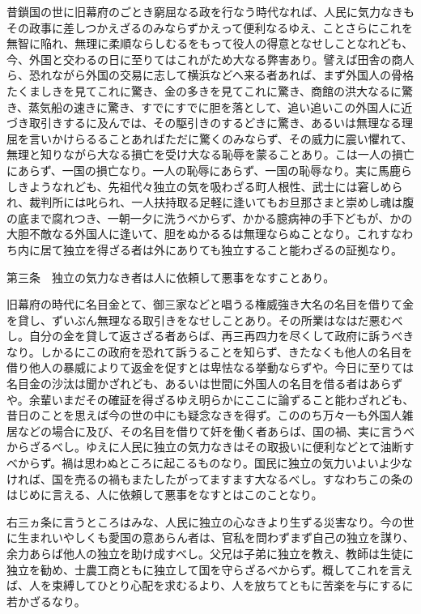 \documentclass[a4paper, platex, dvipdfmx]{jsarticle}
\begin{document}
昔鎖国の世に旧幕府のごとき窮屈なる政を行なう時代なれば、人民に気力なきもその政事に差しつかえざるのみならずかえって便利なるゆえ、ことさらにこれを無智に陥れ、無理に柔順ならしむるをもって役人の得意となせしことなれども、今、外国と交わるの日に至りてはこれがため大なる弊害あり。譬えば田舎の商人ら、恐れながら外国の交易に志して横浜などへ来る者あれば、まず外国人の骨格たくましきを見てこれに驚き、金の多きを見てこれに驚き、商館の洪大なるに驚き、蒸気船の速きに驚き、すでにすでに胆を落として、追い追いこの外国人に近づき取引きするに及んでは、その駆引きのするどきに驚き、あるいは無理なる理屈を言いかけらるることあればただに驚くのみならず、その威力に震い懼れて、無理と知りながら大なる損亡を受け大なる恥辱を蒙ることあり。こは一人の損亡にあらず、一国の損亡なり。一人の恥辱にあらず、一国の恥辱なり。実に馬鹿らしきようなれども、先祖代々独立の気を吸わざる町人根性、武士には窘しめられ、裁判所には叱られ、一人扶持取る足軽に逢いてもお旦那さまと崇めし魂は腹の底まで腐れつき、一朝一夕に洗うべからず、かかる臆病神の手下どもが、かの大胆不敵なる外国人に逢いて、胆をぬかるるは無理ならぬことなり。これすなわち内に居て独立を得ざる者は外にありても独立すること能わざるの証拠なり。

第三条　独立の気力なき者は人に依頼して悪事をなすことあり。

旧幕府の時代に名目金とて、御三家などと唱うる権威強き大名の名目を借りて金を貸し、ずいぶん無理なる取引きをなせしことあり。その所業はなはだ悪むべし。自分の金を貸して返さざる者あらば、再三再四力を尽くして政府に訴うべきなり。しかるにこの政府を恐れて訴うることを知らず、きたなくも他人の名目を借り他人の暴威によりて返金を促すとは卑怯なる挙動ならずや。今日に至りては名目金の沙汰は聞かざれども、あるいは世間に外国人の名目を借る者はあらずや。余輩いまだその確証を得ざるゆえ明らかにここに論ずること能わざれども、昔日のことを思えば今の世の中にも疑念なきを得ず。こののち万々一も外国人雑居などの場合に及び、その名目を借りて奸を働く者あらば、国の禍、実に言うべからざるべし。ゆえに人民に独立の気力なきはその取扱いに便利などとて油断すべからず。禍は思わぬところに起こるものなり。国民に独立の気力いよいよ少なければ、国を売るの禍もまたしたがってますます大なるべし。すなわちこの条のはじめに言える、人に依頼して悪事をなすとはこのことなり。

右三ヵ条に言うところはみな、人民に独立の心なきより生ずる災害なり。今の世に生まれいやしくも愛国の意あらん者は、官私を問わずまず自己の独立を謀り、余力あらば他人の独立を助け成すべし。父兄は子弟に独立を教え、教師は生徒に独立を勧め、士農工商ともに独立して国を守らざるべからず。概してこれを言えば、人を束縛してひとり心配を求むるより、人を放ちてともに苦楽を与にするに若かざるなり。
\end{document}
